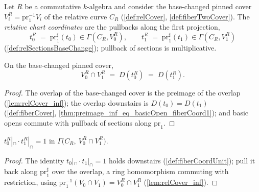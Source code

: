 \begin{definition}
  \label{def:relFiberCoord}
  \leanok
  Let \(R\) be a commutative \(k\)-algebra and consider the base-changed pinned cover
  \(V_i^R = \mathrm{pr}_1^{-1} V_i\) of the relative curve \(C_R\)
  (\ref{def:relCover}, \ref{def:fiberTwoCover}). The \emph{relative chart coordinates}
  are the pullbacks along the first projection,
  \[
    t_0^R \;=\; \mathrm{pr}_1^{\sharp}(t_0) \in \Gamma(C_R, V_0^R), \qquad
    t_1^R \;=\; \mathrm{pr}_1^{\sharp}(t_1) \in \Gamma(C_R, V_1^R)
  \]
  (\ref{def:relSectionsBaseChange}); pullback of sections is multiplicative.
\end{definition}

\begin{theorem}
  \label{thm:relCover_inf_eq_basicOpen}
  \leanok
  On the base-changed pinned cover,
  \[
    V_0^R \cap V_1^R \;=\; D(t_0^R) \;=\; D(t_1^R).
  \]
\end{theorem}
\begin{proof}
  \leanok
  The overlap of the base-changed cover is the preimage of the overlap
  (\ref{lem:relCover_inf}); the overlap downstairs is \(D(t_0) = D(t_1)\)
  (\ref{def:fiberCover}, \ref{thm:preimage_inf_eq_basicOpen_fiberCoord1}); and basic
  opens commute with pullback of sections along \(\mathrm{pr}_1\).
\end{proof}

\begin{theorem}
  \label{thm:relFiberCoord_mul}
  \leanok
  \(t_0^R|_{\cap} \cdot t_1^R|_{\cap} = 1\) in
  \(\Gamma\bigl(C_R,\ V_0^R \cap V_1^R\bigr)\).
\end{theorem}
\begin{proof}
  \leanok
  The identity \(t_0|_{\cap} \cdot t_1|_{\cap} = 1\) holds downstairs
  (\ref{def:fiberCoordUnit}); pull it back along \(\mathrm{pr}_1^{\sharp}\) over the
  overlap, a ring homomorphism commuting with restriction, using
  \(\mathrm{pr}_1^{-1}(V_0 \cap V_1) = V_0^R \cap V_1^R\) (\ref{lem:relCover_inf}).
\end{proof}

